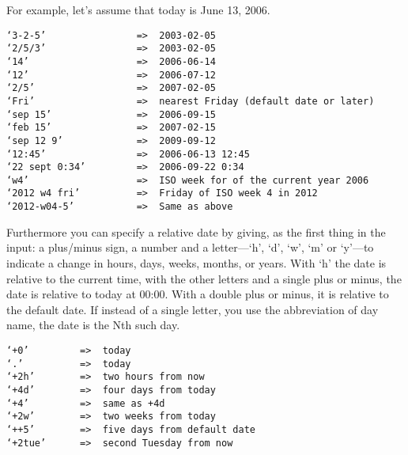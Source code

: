 For example, let’s assume that today is June 13, 2006.
\begin{verbatim}
‘3-2-5’                =>  2003-02-05                            
‘2/5/3’                =>  2003-02-05                            
‘14’                   =>  2006-06-14                            
‘12’                   =>  2006-07-12                            
‘2/5’                  =>  2007-02-05                            
‘Fri’                  =>  nearest Friday (default date or later)
‘sep 15’               =>  2006-09-15                            
‘feb 15’               =>  2007-02-15                            
‘sep 12 9’             =>  2009-09-12                             
‘12:45’                =>  2006-06-13 12:45                       
‘22 sept 0:34’         =>  2006-09-22 0:34                        
‘w4’                   =>  ISO week for of the current year 2006  
‘2012 w4 fri’          =>  Friday of ISO week 4 in 2012           
‘2012-w04-5’           =>  Same as above                          
\end{verbatim}



Furthermore you can specify a relative date by giving, as the first thing in the input: a plus/minus sign, a number and a letter—‘h’, ‘d’, ‘w’, ‘m’ or ‘y’—to indicate a change in hours, days, weeks, months, or years.
With ‘h’ the date is relative to the current time, with the other letters and a single plus or minus, the date is relative to today at 00:00.
With a double plus or minus, it is relative to the default date.
If instead of a single letter, you use the abbreviation of day name, the date is the Nth such day.

\begin{verbatim}
‘+0’         =>  today
‘.’          =>  today
‘+2h’        =>  two hours from now
‘+4d’        =>  four days from today
‘+4’         =>  same as +4d
‘+2w’        =>  two weeks from today
‘++5’        =>  five days from default date
‘+2tue’      =>  second Tuesday from now
\end{verbatim}

